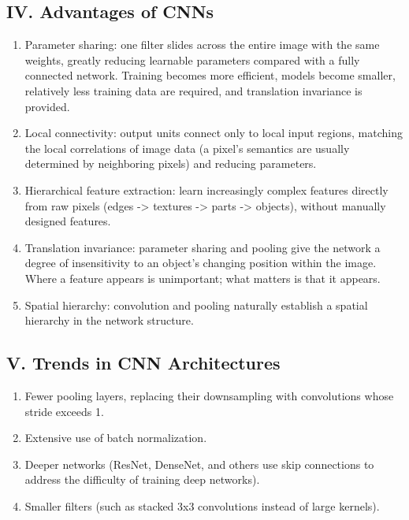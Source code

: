 \hypertarget{iv.-advantages-of-cnns}{%
\subsection{IV. Advantages of CNNs}\label{iv.-advantages-of-cnns}}

\begin{enumerate}
\def\labelenumi{\arabic{enumi}.}
\item
  Parameter sharing: one filter slides across the entire image with the same weights, greatly reducing learnable parameters compared with a fully connected network. Training becomes more efficient, models become smaller, relatively less training data are required, and translation invariance is provided.
\item
  Local connectivity: output units connect only to local input regions, matching the local correlations of image data (a pixel's semantics are usually determined by neighboring pixels) and reducing parameters.
\item
  Hierarchical feature extraction: learn increasingly complex features directly from raw pixels (edges -\textgreater{} textures -\textgreater{} parts -\textgreater{} objects), without manually designed features.
\item
  Translation invariance: parameter sharing and pooling give the network a degree of insensitivity to an object's changing position within the image. Where a feature appears is unimportant; what matters is that it appears.
\item
  Spatial hierarchy: convolution and pooling naturally establish a spatial hierarchy in the network structure.
\end{enumerate}

\hypertarget{v.-trends-in-cnn-architectures}{%
\subsection{V. Trends in CNN Architectures}\label{v.-trends-in-cnn-architectures}}

\begin{enumerate}
\def\labelenumi{\arabic{enumi}.}
\item
  Fewer pooling layers, replacing their downsampling with convolutions whose stride exceeds 1.
\item
  Extensive use of batch normalization.
\item
  Deeper networks (ResNet, DenseNet, and others use skip connections to address the difficulty of training deep networks).
\item
  Smaller filters (such as stacked 3x3 convolutions instead of large kernels).
\end{enumerate}

